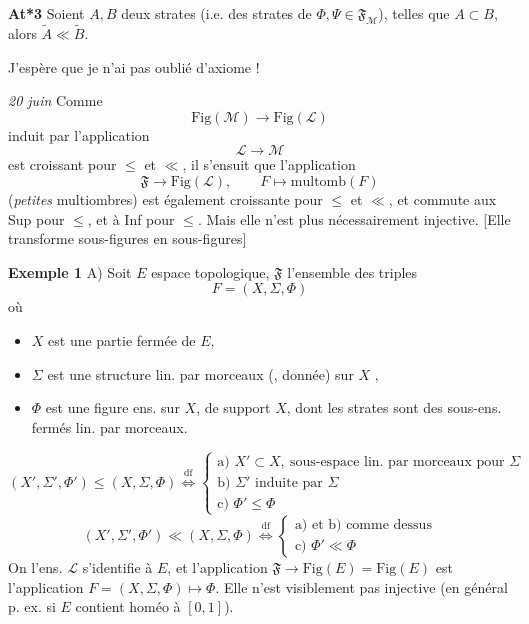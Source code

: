 \documentclass[11pt,a4paper]{article}
\begin{document}
\textbf{At*3} Soient $A, B$ deux strates \add{\ill{}} (i.e. des strates de $\Phi, \Psi \in \mathfrak{F}_{\mathcal{M}}$), telles que $A \subset B$, alors $\widetilde{A} \ll \widetilde{B}$.


J'espère que je n'ai pas oublié d'axiome !


\emph{20 juin} Comme
\[
  \mathrm{Fig}(\mathcal{M}) \longrightarrow \mathrm{Fig}(\mathcal{L})
\]
induit par l'application
\[
  \mathcal{L} \longrightarrow \mathcal{M}
\]
est croissant pour $\leq$ et $\ll$, il s'ensuit que l'application
\[
  \mathfrak{F} \longrightarrow \mathrm{Fig}(\mathcal{L}), \qquad F \longmapsto \mathrm{multomb}(F)
\]
(\emph{petites} multiombres) est également croissante pour $\leq$ et $\ll$, et commute aux Sup pour $\leq$, et à Inf pour $\leq$. Mais elle n'est plus nécessairement injective. [Elle transforme sous-figures en sous-figures]

\textbf{Exemple 1} A) Soit $E$ espace topologique, \struck{$\ill{}$} $\mathfrak{F}$ l'ensemble des   triples
\[
  F = (X, \Sigma, \Phi)
\]
où
\begin{itemize}
  \item $X$ est une partie fermée de $E$,
  \item $\Sigma$ est une structure lin. par morceaux (\ill{}, \ill{} donnée) sur $X$  \ill{},
  \item $\Phi$ est une figure ens. sur $X$, de support $X$, dont les strates sont des sous-ens. fermés lin. par morceaux.
\end{itemize}
\[
  (X', \Sigma', \Phi') \leq (X, \Sigma, \Phi) \overset{\mathrm{df}}{\Longleftrightarrow} \begin{cases} \text{a) } X' \subset X,\ \text{sous-espace lin. par morceaux pour } \Sigma \\ \text{b) } \Sigma' \text{ induite par } \Sigma \\ \text{c) } \Phi' \leq \Phi \end{cases}
\]
\[
  (X', \Sigma', \Phi') \ll (X, \Sigma, \Phi) \overset{\mathrm{df}}{\Longleftrightarrow} \begin{cases} \text{a) et b) comme dessus} \\ \text{c) } \Phi' \ll \Phi \end{cases}
\]
On \ill{} \ill{} l'ens. $\mathcal{L}$ s'identifie à $E$, et l'application $\mathfrak{F} \to \mathrm{Fig}(E) = \mathrm{Fig}(E)$ est l'application $F = (X, \Sigma, \Phi) \mapsto \Phi$. Elle n'est visiblement pas injective (en général p. ex. si $E$ contient \ill{} homéo à $[0,1]$).
\end{document}
